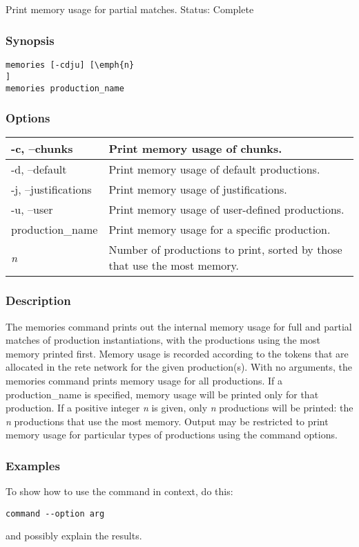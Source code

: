 \subsection{}
\label{memories}
Print memory usage for partial matches. 
 Status: Complete
\subsubsection*{Synopsis}
\begin{verbatim}
memories [-cdju] [\emph{n}
]
memories production_name 
\end{verbatim}
\subsubsection*{Options}
\begin{tabular}{|l|l|}
\hline 
 -c, --chunks  & Print memory usage of chunks.  \\
 \hline 
 -d, --default  & Print memory usage of default productions.  \\
 \hline 
 -j, --justifications  & Print memory usage of justifications.  \\
 \hline 
 -u, --user  & Print memory usage of user-defined productions.  \\
 \hline 
production\_name & Print memory usage for a specific production.  \\
 \hline 
\emph{n}
 & Number of productions to print, sorted by those that use the most memory.  \\
 \hline 
\end{tabular}
\subsubsection*{Description}
 The memories command prints out the internal memory usage for full and partial matches of production instantiations, with the productions using the most memory printed first. 
 Memory usage is recorded according to the tokens that are allocated in the rete network for the given production(s). 
 With no arguments, the memories command prints memory usage for all productions. If a production\_name is specified, memory usage will be printed only for that production. If a positive integer \emph{n}
 is given, only \emph{n}
 productions will be printed: the \emph{n}
 productions that use the most memory. 
 Output may be restricted to print memory usage for particular types of productions using the command options. 
\subsubsection*{Examples}
 To show how to use the command in context, do this: \begin{verbatim}
command --option arg
\end{verbatim}
 and possibly explain the results. 
